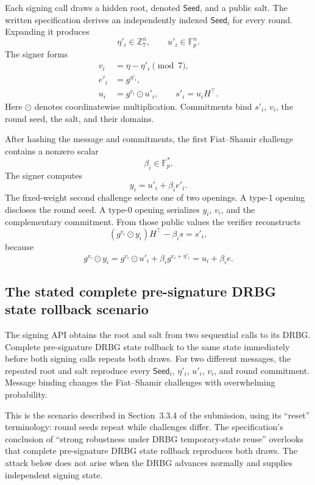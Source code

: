 \documentclass[11pt,a4paper]{article}
\newcommand{\F}{\mathbb F}
\newcommand{\Z}{\mathbb Z}
\begin{document}
Each signing call draws a hidden root, denoted $\mathsf{Seed}$, and a public
salt.  The written specification derives an independently indexed
$\mathsf{Seed}_i$ for every round.  Expanding it produces
\[
          \eta'_i\in\Z_7^n,\qquad u'_i\in\F_p^n.
\]
The signer forms
\begin{align}
 v_i   &= \eta-\eta'_i \pmod 7,                              \label{eq:v}\\
 e'_i  &= g^{\eta'_i},                                      \label{eq:eprime}\\
 u_i   &= g^{v_i}\odot u'_i,\qquad
 s'_i = u_iH^\top.                                          \label{eq:commitstate}
\end{align}
Here $\odot$ denotes coordinatewise multiplication.  Commitments bind $s'_i$,
$v_i$, the round seed, the salt, and their domains.

After hashing the message and commitments, the first Fiat--Shamir challenge
contains a nonzero scalar
\[
                         \beta_i\in\F_p^*.
\]
The signer computes
\begin{equation}
                         y_i=u'_i+\beta_i e'_i.               \label{eq:y}
\end{equation}
The fixed-weight second challenge selects one of two openings.  A type-1
opening discloses the round seed.  A type-0 opening serializes $y_i$, $v_i$,
and the complementary commitment.  From those public values the verifier
reconstructs
\begin{equation}
        (g^{v_i}\odot y_i)H^\top-\beta_i s=s'_i,              \label{eq:verify}
\end{equation}
because
\[
 g^{v_i}\odot y_i
 =g^{v_i}\odot u'_i+\beta_i g^{v_i+\eta'_i}
 =u_i+\beta_i e.
\]

\subsection{The stated complete pre-signature DRBG state rollback scenario}

The signing API obtains the root and salt from two sequential calls to its
DRBG.  Complete pre-signature DRBG state rollback to the same state immediately
before both signing calls repeats both draws.  For two different messages, the repeated
root and salt reproduce every
$\mathsf{Seed}_i$, $\eta'_i$, $u'_i$, $v_i$, and round commitment.  Message
binding changes the Fiat--Shamir challenges with overwhelming probability.

This is the scenario described in Section~3.3.4 of the submission, using its
``reset'' terminology: round seeds repeat while challenges differ.  The
specification's conclusion of ``strong robustness under DRBG temporary-state
reuse'' overlooks that complete pre-signature DRBG state rollback reproduces
both draws.  The attack below does not arise when the DRBG advances normally
and supplies independent signing state.
\end{document}
